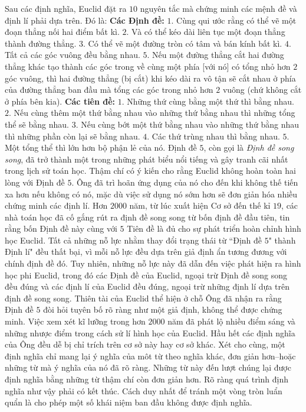 \begin{multicols}{2}
	\vskip 0.1cm
	Sau các định nghĩa, Euclid đặt ra $10$ nguyên tắc mà chứng minh các mệnh đề và định lí phải dựa trên. Đó là:
	\vskip 0.1cm
	\textbf{\color{lichsutoanhoc}Các Định đề:}
	\vskip 0.1cm
	$1.$ Cùng qui ước rằng có thể vẽ một đoạn thẳng nối hai điểm bất kì.
	\vskip 0.1cm
	$2.$ Và có thể kéo dài liên tục một đoạn thẳng thành đường thẳng.
	\vskip 0.1cm
	$3.$ Có thể vẽ một đường tròn có tâm và bán kính bất kì.
	\vskip 0.1cm
	$4.$ Tất cả các góc vuông đều bằng nhau.
	\vskip 0.1cm
	$5.$ Nếu một đường thẳng cắt hai đường thẳng khác tạo thành các góc trong về cùng một phía [với nó] có tổng nhỏ hơn $2$ góc vuông, thì hai đường thẳng (bị cắt) khi kéo dài ra vô tận sẽ cắt nhau ở phía của đường thẳng ban đầu mà tổng các góc trong nhỏ hơn $2$ vuông (chứ không cắt ở phía bên kia). 
	\vskip 0.1cm
	\textbf{\color{lichsutoanhoc}Các tiên đề:}
	\vskip 0.1cm
	$1.$ Những thứ cùng bằng một thứ thì bằng nhau.
	\vskip 0.1cm
	$2.$ Nếu cùng thêm một thứ bằng nhau vào những thứ bằng nhau thì những tổng thể sẽ bằng nhau.
	\vskip 0.1cm
	$3.$ Nếu cùng bớt một thứ bằng nhau vào những thứ bằng nhau thì những phần còn lại sẽ bằng nhau.
	\vskip 0.1cm
	$4.$ Các thứ trùng nhau thì bằng nhau.
	\vskip 0.1cm
	$5.$ Một tổng thể thì lớn hơn bộ phận lẻ của nó.
	\vskip 0.1cm
	Định đề $5$, còn gọi là \textit{Định đề song song}, đã trở thành một trong những phát biểu nổi tiếng và gây tranh cãi nhất trong lịch sử toán học. Thậm chí có ý kiến cho rằng Euclid không hoàn toàn hai lòng với Định đề $5$. Ông đã trì hoãn ứng dụng của nó cho đến khi không thế tiến xa hơn nếu không có nó, mặc dù việc sử dụng nó sớm hơn sẽ đơn giản hóa nhiều chứng minh các định lí.
	\vskip 0.1cm
	Hơn $2000$ năm, từ lúc xuất hiện Cơ sở đến thế kỉ $19$, các nhà toán học đã cố gắng rút ra định đề song song từ bốn định đề đầu tiên, tin rằng bốn Định đề này cùng với $5$ Tiên đề là đủ cho sự phát triển hoàn chỉnh hình học Euclid. Tất cả những nỗ lực nhằm thay đổi trạng thái từ ``Định đề $5$" thành Định lí" đều thất bại, vì mỗi nỗ lực đều dựa trên giả định ẩn tương đương với chính định đề đó. 
	\vskip 0.1cm
	Tuy nhiên, những nỗ lực này đã dẫn đến việc phát hiện ra hình học phi Euclid, trong đó các Định đề của Euclid, ngoại trừ Định đề song song đều đúng và các định lí của Euclid đều đúng, ngoại trừ những định lí dựa trên định đề song song. Thiên tài của Euclid thể hiện ở chỗ Ông đã nhận ra rằng Định đề $5$ đòi hỏi tuyên bố rõ ràng như một giả định, không thể được chứng minh.   
	\vskip 0.1cm
	Việc xem xét kĩ lưỡng trong hơn $2000$ năm đã phát lộ nhiều điểm sáng và những nhược điểm trong cách sử lí hình học của Euclid. Hầu hết các định nghĩa của Ông đều dễ bị chỉ trích trên cơ sở này hay cơ sở khác. Xét cho cùng, một định nghĩa chỉ mang lại ý nghĩa của môt từ theo nghĩa khác, đơn giản hơn--hoặc những từ mà ý nghĩa của nó đã rõ ràng. Những từ này đến lượt chúng lại được định nghĩa bằng những từ thậm chí còn đơn giản hơn. Rõ ràng quá trình định nghĩa như vậy phải có kết thúc. Cách duy nhất để tránh một vòng tròn luẩn quẩn là cho phép một số khái niệm ban đầu không được định nghĩa.

\end{multicols}
